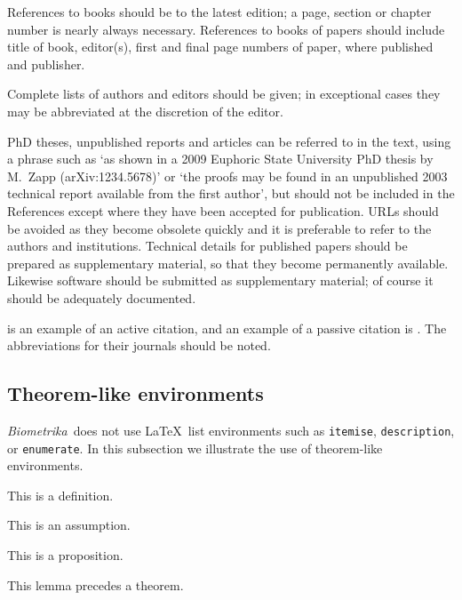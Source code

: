 \documentclass[article,lineno]{biometrika}
\def\Bka{{\it Biometrika}}
\begin{document}
References to books should be to the latest edition; a page, section or chapter number
is nearly always necessary. References to books of papers should include title of book,
editor(s), first and final page numbers of paper, where published and publisher.

Complete lists of authors and editors should be given; in exceptional cases they may be abbreviated at the discretion of the editor.

PhD theses, unpublished reports and articles can be referred to in the text, using a phrase such as `as shown in a 2009 Euphoric State University PhD thesis by M.~Zapp (arXiv:1234.5678)' or `the proofs may be found in an unpublished 2003 technical report available from the first author', but should not be included in the References except where they have been accepted for publication. URLs should be avoided as they become obsolete quickly and it is preferable to refer to the authors and institutions.  Technical details for published papers should be prepared as supplementary material, so that they become permanently available. Likewise software should be submitted as supplementary material; of course it should be adequately documented.

\citet{Cox:1972} is an example of an active citation, and an example of a passive citation is  \citep{Hear:Holm:Step:quan:2006}.  The abbreviations for their journals should be noted.

\subsection{Theorem-like environments}

\Bka\ does not use \LaTeX\ list environments such as \texttt{itemise}, \texttt{description}, or \texttt{enumerate}.
In this subsection we illustrate the use of theorem-like environments.

\begin{definition}
This is a definition.
\end{definition}

\begin{assumption}
\label{assumptionA}
This is an assumption.
\end{assumption}

\begin{proposition}
This is a proposition.
\end{proposition}

\begin{lemma}
\label{lemma1}
This lemma precedes a theorem.
\end{lemma}
\end{document}
